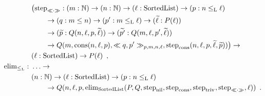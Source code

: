 \documentclass[orivec,envcountsame, ,envcountsect]{llncs}
\begin{document}
\begin{example}
\begin{align*}
                     & \big(\stepind{\consLessbare} : (m : \Nat) \to (n : \Nat) \to (\ell : \SortedList) \to (p : n \lessList \ell) \\
                     & \qquad \to (q : m \leq n) \to (p' : m \lessList \ell) \to
                     (\stepindarg{\ell} : P(\ell)) \\ 
                     & \qquad \to (\stepindarg{p} : Q(n, \ell,p, \stepindarg{\ell}))
                     \to (\stepindarg{p'} : Q(m, \ell, p', \stepindarg{\ell})) \\
                     & \qquad \to Q(m,\consList{n}{\ell}{p}, \consLess{m}{n}{\ell}{p}{q}{p'}, \stepind{\consListbare}(n, \ell, p, \stepindarg{\ell}, \stepindarg{p}))\big) \to \\
                     & (\ell : \SortedList) \to P(\ell) \enspace , \\
%
  \elim_{\lessList} :\ & \ldots \to \\
                     & (n : \Nat) \to (\ell : \SortedList) \to (p : n \lessList \ell) \\
                     & \qquad \to Q(n, \ell, p, \elim_{\SortedList}(P, Q, \stepind{\nilList}, \stepind{\consListbare},  \stepind{\nilLess{}}, \stepind{\consLessbare}, \ell)) \enspace .
  \end{align*}
 \end{example}
\end{document}
